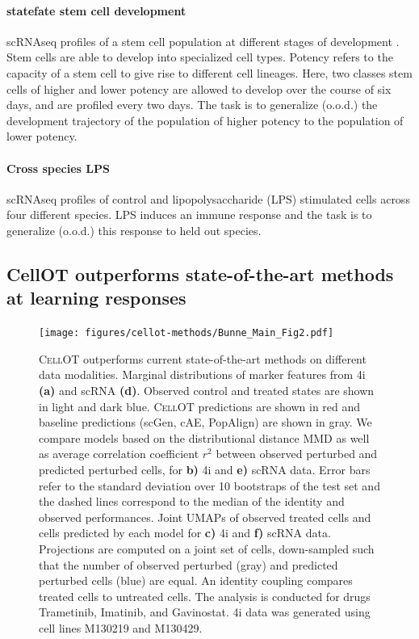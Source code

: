 \paragraph{statefate stem cell development}
scRNAseq profiles of a stem cell population at different stages of development \cite{weinreb2020}.
Stem cells are able to develop into specialized cell types.
Potency refers to the capacity of a stem cell to give rise to different cell lineages.
Here, two classes stem cells of higher and lower potency are allowed to develop over the course of six days, and are profiled every two days.
The task is to generalize (o.o.d.) the development trajectory of the population of higher potency to the population of lower potency.

\paragraph{Cross species LPS}
scRNAseq profiles of control and lipopolysaccharide (LPS) stimulated cells across four different species.
LPS induces an immune response and 
the task is to generalize (o.o.d.) this response to held out species.

\subsection{CellOT outperforms state-of-the-art methods at learning responses}

\begin{figure}
  \begin{center}
    \texttt{[image: figures/cellot-methods/Bunne\_Main\_Fig2.pdf]}
  \end{center}
  \caption{
  \textsc{CellOT} outperforms current state-of-the-art methods on different data modalities.
  Marginal distributions of marker features from  4i \textbf{(a)} and scRNA \textbf{(d)}.
  Observed control and treated states are shown in light and dark blue.
  \textsc{CellOT} predictions are shown in red and baseline predictions (scGen, cAE, PopAlign) are shown in gray.
  We compare models based on the distributional distance MMD as well as average correlation coefficient $r^2$ between observed perturbed and predicted perturbed cells, for \textbf{b)} 4i and \textbf{e)} scRNA data. Error bars refer to the standard deviation over 10 bootstraps of the test set and the dashed lines correspond to the median of the identity and observed performances. Joint UMAPs of observed treated cells and cells predicted by each model for \textbf{c)} 4i and \textbf{f)} scRNA data. Projections are computed on a joint set of cells, down-sampled such that the number of observed perturbed (gray) and predicted perturbed cells (blue) are equal. An identity coupling compares treated cells to untreated cells. The analysis is conducted for drugs Trametinib, Imatinib, and Gavinostat. 4i data was generated using cell lines M130219 and M130429.}

  \label{fig:cellot-main-marginals}
\end{figure}

